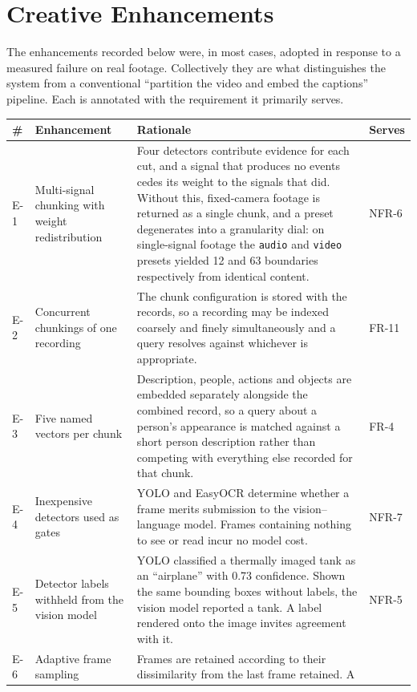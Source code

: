 \section{Creative Enhancements}

The enhancements recorded below were, in most cases, adopted in response to a
measured failure on real footage. Collectively they are what distinguishes the system
from a conventional ``partition the video and embed the captions'' pipeline. Each is
annotated with the requirement it primarily serves.

\begin{table}[htbp]
\centering
\small
\begin{tabularx}{\textwidth}{@{}lL{3.5cm}XL{1.3cm}@{}}
\toprule
\textbf{\#} & \textbf{Enhancement} & \textbf{Rationale} & \textbf{Serves} \\
\midrule
E-1 & Multi-signal chunking with weight redistribution &
Four detectors contribute evidence for each cut, and a signal that produces no events
cedes its weight to the signals that did. Without this, fixed-camera footage is
returned as a single chunk, and a preset degenerates into a granularity dial: on
single-signal footage the \texttt{audio} and \texttt{video} presets yielded 12 and 63
boundaries respectively from identical content. & NFR-6 \\
E-2 & Concurrent chunkings of one recording &
The chunk configuration is stored with the records, so a recording may be indexed
coarsely and finely simultaneously and a query resolves against whichever is
appropriate. & FR-11 \\
E-3 & Five named vectors per chunk &
Description, people, actions and objects are embedded separately alongside the
combined record, so a query about a person's appearance is matched against a short
person description rather than competing with everything else recorded for that chunk.
& FR-4 \\
E-4 & Inexpensive detectors used as gates &
YOLO and EasyOCR determine whether a frame merits submission to the vision--language
model. Frames containing nothing to see or read incur no model cost. & NFR-7 \\
E-5 & Detector labels withheld from the vision model &
YOLO classified a thermally imaged tank as an ``airplane'' with 0.73 confidence. Shown
the same bounding boxes without labels, the vision model reported a tank. A label
rendered onto the image invites agreement with it. & NFR-5 \\
E-6 & Adaptive frame sampling &
Frames are retained according to their dissimilarity from the last frame retained. A

\end{tabularx}
\end{table}

